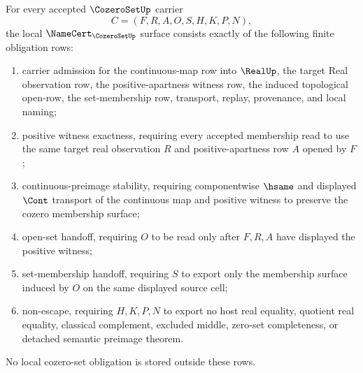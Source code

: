 \begin{theorem}
\label{thm:cozero-set-namecert-obligations}
For every accepted $\CozeroSetUp$ carrier
$$
C=(F,R,A,O,S,H,K,P,N),
$$
the local $\NameCert_{\CozeroSetUp}$ surface consists exactly of the following finite obligation rows:
\begin{enumerate}
\item carrier admission for the continuous-map row into $\RealUp$, the target Real observation row, the positive-apartness witness row, the induced topological open-row, the set-membership row, transport, replay, provenance, and local naming;
\item positive witness exactness, requiring every accepted membership read to use the same target real observation $R$ and positive-apartness row $A$ opened by $F$;
\item continuous-preimage stability, requiring componentwise $\hsame$ and displayed $\Cont$ transport of the continuous map and positive witness to preserve the cozero membership surface;
\item open-set handoff, requiring $O$ to be read only after $F,R,A$ have displayed the positive witness;
\item set-membership handoff, requiring $S$ to export only the membership surface induced by $O$ on the same displayed source cell;
\item non-escape, requiring $H,K,P,N$ to export no host real equality, quotient real equality, classical complement, excluded middle, zero-set completeness, or detached semantic preimage theorem.
\end{enumerate}
No local cozero-set obligation is stored outside these rows.
\end{theorem}

